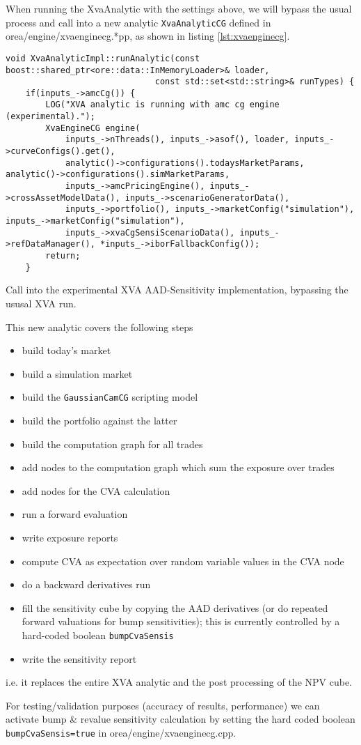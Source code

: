 When running the XvaAnalytic with the settings above, we will bypass the usual process
and call into a new analytic {\tt XvaAnalyticCG} defined in orea/engine/xvaenginecg.*pp,
as shown in listing \ref{lst:xvaenginecg}.

\begin{listing}[hbt]
\begin{verbatim}
void XvaAnalyticImpl::runAnalytic(const boost::shared_ptr<ore::data::InMemoryLoader>& loader,
                              const std::set<std::string>& runTypes) {
    if(inputs_->amcCg()) {
        LOG("XVA analytic is running with amc cg engine (experimental).");
        XvaEngineCG engine(
            inputs_->nThreads(), inputs_->asof(), loader, inputs_->curveConfigs().get(),
            analytic()->configurations().todaysMarketParams, analytic()->configurations().simMarketParams,
            inputs_->amcPricingEngine(), inputs_->crossAssetModelData(), inputs_->scenarioGeneratorData(),
            inputs_->portfolio(), inputs_->marketConfig("simulation"), inputs_->marketConfig("simulation"),
            inputs_->xvaCgSensiScenarioData(), inputs_->refDataManager(), *inputs_->iborFallbackConfig());
        return;
    }
\end{verbatim}
\caption{Call into the experimental XVA AAD-Sensitivity implementation, bypassing the ususal XVA run.}
\label{lst:xvaenginecg}
\end{listing}

This new analytic covers the following steps
\begin{itemize}
\item build today's market
\item build a simulation market
\item build the {\tt GaussianCamCG} scripting model
\item build the portfolio against the latter
\item build the computation graph for all trades
\item add nodes to the computation graph which sum the exposure over trades
\item add nodes for the CVA calculation
\item run a forward evaluation
\item write exposure reports
\item compute CVA as expectation over random variable values in the CVA node
\item do a backward derivatives run
\item fill the sensitivity cube by copying the AAD derivatives (or do repeated forward valuations for bump sensitivities);
  this is currently controlled by a hard-coded boolean {\tt bumpCvaSensis}
\item write the sensitivity report
\end{itemize}

i.e. it replaces the entire XVA analytic and the post processing of the NPV cube.

For testing/validation purposes (accuracy of results, performance) we can activate bump \& revalue sensitivity
calculation by setting the hard coded boolean {\tt bumpCvaSensis=true} in orea/engine/xvaenginecg.cpp.

